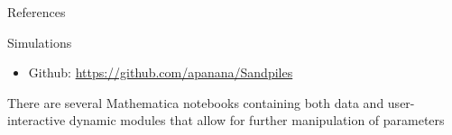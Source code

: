 \documentclass[final]{beamer}
\newlength{\onecolwid}
\begin{document}
\begin{frame}[t]
\begin{columns}[t]
\begin{column}{\onecolwid}
\begin{block}{References}
\end{block}




\begin{alertblock}{Simulations}

\begin{itemize}
\item Github: \href{https://github.com/apanana/Sandpiles}{https://github.com/apanana/Sandpiles}
\end{itemize}

There are several Mathematica notebooks containing both data and user-interactive dynamic modules that allow for further manipulation of parameters
\end{alertblock}


\end{column} %

\end{columns} %

\end{frame} %
\end{document}
